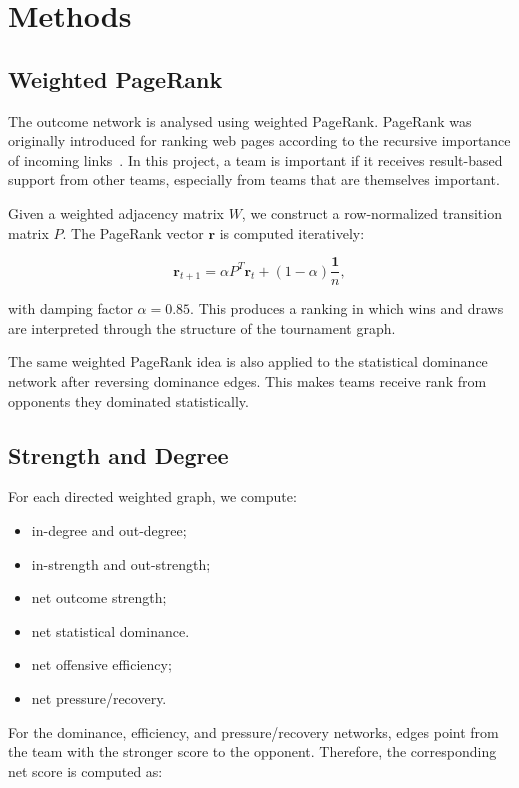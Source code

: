 \documentclass[10pt,twocolumn]{article}
\begin{document}
\section{Methods}

\subsection{Weighted PageRank}

The outcome network is analysed using weighted PageRank. PageRank was originally introduced for ranking web pages according to the recursive importance of incoming links~\cite{brin1998pagerank}. In this project, a team is important if it receives result-based support from other teams, especially from teams that are themselves important.

Given a weighted adjacency matrix $W$, we construct a row-normalized transition matrix $P$. The PageRank vector $\mathbf{r}$ is computed iteratively:

\[
    \mathbf{r}_{t+1} = \alpha P^T \mathbf{r}_t + (1-\alpha)\frac{\mathbf{1}}{n},
\]

with damping factor $\alpha = 0.85$. This produces a ranking in which wins and draws are interpreted through the structure of the tournament graph.

The same weighted PageRank idea is also applied to the statistical dominance network after reversing dominance edges. This makes teams receive rank from opponents they dominated statistically.

\subsection{Strength and Degree}

For each directed weighted graph, we compute:

\begin{itemize}
    \item in-degree and out-degree;
    \item in-strength and out-strength;
    \item net outcome strength;
    \item net statistical dominance.
    \item net offensive efficiency;
    \item net pressure/recovery.
\end{itemize}

For the dominance, efficiency, and pressure/recovery networks, edges point from the team with the stronger score to the opponent. Therefore, the corresponding net score is computed as:
\end{document}
